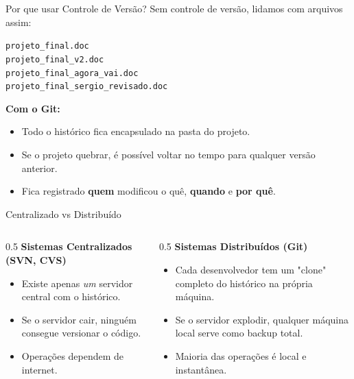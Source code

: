 \documentclass[aspectratio=169]{beamer}
\begin{document}
\begin{frame}{Por que usar Controle de Versão?}
    Sem controle de versão, lidamos com arquivos assim:
    \begin{center}
        \texttt{projeto\_final.doc} \\
        \texttt{projeto\_final\_v2.doc} \\
        \texttt{projeto\_final\_agora\_vai.doc} \\
        \texttt{projeto\_final\_sergio\_revisado.doc}
    \end{center}
    \vspace{0.3cm}
    \textbf{Com o Git:}
    \begin{itemize}
        \item Todo o histórico fica encapsulado na pasta do projeto.
        \item Se o projeto quebrar, é possível voltar no tempo para qualquer versão anterior.
        \item Fica registrado \textbf{quem} modificou o quê, \textbf{quando} e \textbf{por quê}.
    \end{itemize}
\end{frame}

\begin{frame}{Centralizado vs Distribuído}
    \begin{columns}
        \begin{column}{0.5\textwidth}
            \textbf{Sistemas Centralizados (SVN, CVS)}
            \begin{itemize}
                \item Existe apenas \textit{um} servidor central com o histórico.
                \item Se o servidor cair, ninguém consegue versionar o código.
                \item Operações dependem de internet.
            \end{itemize}
        \end{column}
        \begin{column}{0.5\textwidth}
            \textbf{Sistemas Distribuídos (Git)}
            \begin{itemize}
                \item Cada desenvolvedor tem um "clone" completo do histórico na própria máquina.
                \item Se o servidor explodir, qualquer máquina local serve como backup total.
                \item Maioria das operações é local e instantânea.
            \end{itemize}
        \end{column}
    \end{columns}
\end{frame}
\end{document}
